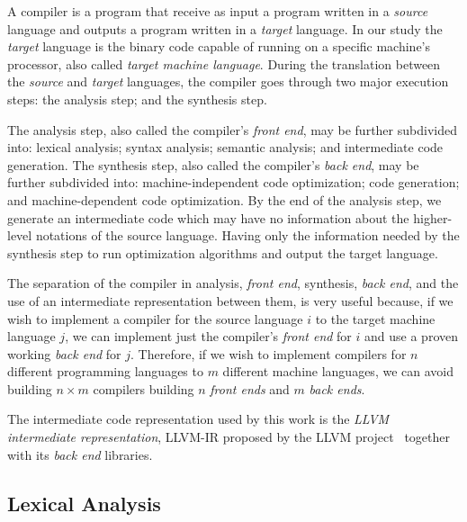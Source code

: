 \documentclass[
  english,
  lmodern,
  oneside
]{ufsc-thesis-rn46-2019/ufsc-thesis-rn46-2019}
\begin{document}
A compiler is a program that receive as input a program written in a \textit{source} language and outputs a program written in a \textit{target} language.
In our study the \textit{target} language is the binary code capable of running on a specific machine's processor, also called \textit{target machine language}.
During the translation between the \textit{source} and \textit{target} languages, the compiler goes through two major execution steps: the analysis step; and the synthesis step.

The analysis step, also called the compiler's \textit{front end}, may be further subdivided into: lexical analysis; syntax analysis; semantic analysis; and intermediate code generation.
The synthesis step, also called the compiler's \textit{back end}, may be further subdivided into: machine-independent code optimization; code generation; and machine-dependent code optimization.
By the end of the analysis step, we generate an intermediate code which may have no information about the higher-level notations of the source language.
Having only the information needed by the synthesis step to run optimization algorithms and output the target language.

The separation of the compiler in analysis, \textit{front end}, synthesis, \textit{back end}, and the use of an intermediate representation between them, is very useful because, if we wish to implement a compiler for the source language $i$ to the target machine language $j$, we can implement just the compiler's \textit{front end} for $i$ and use a proven working \textit{back end} for $j$.
Therefore, if we wish to implement compilers for $n$ different programming languages to $m$ different machine languages, we can avoid building $n \times m$ compilers building $n$ \textit{front ends} and $m$ \textit{back ends}.

The intermediate code representation used by this work is the \textit{LLVM intermediate representation}, LLVM-IR proposed by the LLVM project~\cite{lattner2004llvm} together with its \textit{back end} libraries.


\subsection{Lexical Analysis}
\end{document}
